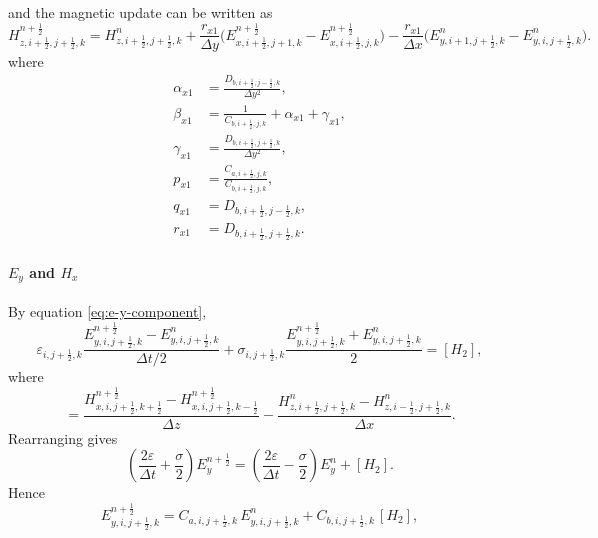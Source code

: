 \documentclass{article}
\numberwithin{equation}{section}
\numberwithin{figure}{section}
\begin{document}
and the magnetic update can be written as
\begin{equation}
    H_{z,i+\tfrac12,j+\tfrac12,k}^{n+\frac12} = H_{z,i+\tfrac12,j+\tfrac12,k}^{n} + \frac{r_{x1}}{\Delta y}\Big(E_{x,i+\tfrac12,j+1,k}^{n+\frac12}-E_{x,i+\tfrac12,j,k}^{n+\frac12}\Big) - \frac{r_{x1}}{\Delta x}\Big(E_{y,i+1,j+\tfrac12,k}^{n}-E_{y,i,j+\tfrac12,k}^{n}\Big).
    \label{eq:adi-first-hz}
\end{equation}
where
\begin{align}
    \alpha_{x1} & =\frac{D_{b,i+\tfrac12,j-\tfrac12,k}}{\Delta y^2},       \\
    \beta_{x1}  & =\frac{1}{C_{b,i+\tfrac12,j,k}}+\alpha_{x1}+\gamma_{x1}, \\
    \gamma_{x1} & =\frac{D_{b,i+\tfrac12,j+\tfrac12,k}}{\Delta y^2},       \\
    p_{x1}      & =\frac{C_{a,i+\tfrac12,j,k}}{C_{b,i+\tfrac12,j,k}},      \\
    q_{x1}      & =D_{b,i+\tfrac12,j-\tfrac12,k},                          \\
    r_{x1}      & =D_{b,i+\tfrac12,j+\tfrac12,k}.
\end{align}

\paragraph{$E_y$ and $H_x$}
By equation \eqref{eq:e-y-component},
\begin{equation}
    \varepsilon_{i,j+\tfrac12,k} \frac{E_{y,i,j+\tfrac12,k}^{n+\frac12}-E_{y,i,j+\tfrac12,k}^{n}}{\Delta t/2} + \sigma_{i,j+\tfrac12,k} \frac{E_{y,i,j+\tfrac12,k}^{n+\frac12}+E_{y,i,j+\tfrac12,k}^{n}}{2} = [H_2],
    \label{eq:first-e-ey}
\end{equation}
where
\begin{equation}
    [H_2] = \frac{H_{x,i,j+\tfrac12,k+\tfrac12}^{n+\frac12}-H_{x,i,j+\tfrac12,k-\tfrac12}^{n+\frac12}}{\Delta z} - \frac{H_{z,i+\tfrac12,j+\tfrac12,k}^{n}-H_{z,i-\tfrac12,j+\tfrac12,k}^{n}}{\Delta x}.
\end{equation}
Rearranging gives
\begin{equation}
    \left(\frac{2\varepsilon}{\Delta t}+\frac{\sigma}{2}\right) E_{y}^{n+\frac12} = \left(\frac{2\varepsilon}{\Delta t}-\frac{\sigma}{2}\right) E_{y}^{n} + [H_2].
\end{equation}
Hence
\begin{equation}
    E_{y,i,j+\tfrac12,k}^{n+\frac12} = C_{a,i,j+\tfrac12,k}\,E_{y,i,j+\tfrac12,k}^{n} + C_{b,i,j+\tfrac12,k}\,[H_2],
    \label{eq:first-e-ey-adi}
\end{equation}
\end{document}
